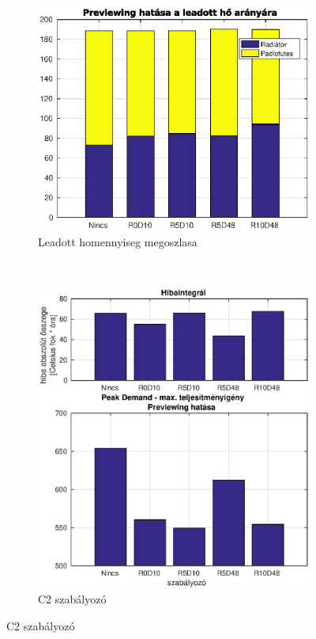 \begin{figure}[H]
	\begin{subfigure}[t]{0.48\textwidth}
		\centering
		\includegraphics[trim=0 0 0 0, clip,width=1.1\textwidth]{figures/onlab/compare/A_compareEnergy}
		\caption{Leadott homennyiseg megoszlasa}
		\label{fig:constrefHeat}
	\end{subfigure}
	~
	\begin{subfigure}[t]{0.48\textwidth}
		\centering
		\includegraphics[trim=0 0 0 0, clip,width=1.1\textwidth]{figures/onlab/compare/A_compareComfort}
		\caption{C2 szabályozó}
		\label{fig:mpc-PeakDemand}
	\end{subfigure}
\end{figure}

